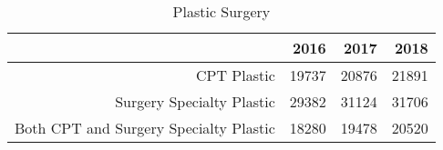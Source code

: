 \begin{table}[ht]
\centering
\begin{tabular}{rrrr}
  \hline
 & 2016 & 2017 & 2018 \\ 
  \hline
CPT Plastic & 19737 & 20876 & 21891 \\ 
  Surgery Specialty Plastic & 29382 & 31124 & 31706 \\ 
  Both CPT and Surgery Specialty Plastic & 18280 & 19478 & 20520 \\ 
   \hline
\end{tabular}
\caption{Plastic Surgery} 
\end{table}
